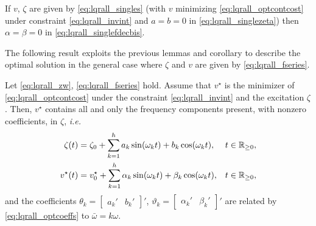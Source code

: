 \begin{corollary}
	If $v$, $\zeta$ are given by \eqref{eq:lqrall_singles} (with $v$ minimizing \eqref{eq:lqrall_optcontcost} under constraint \eqref{eq:lqrall_invint} and $a=b=0$ in \eqref{eq:lqrall_singlezeta}) then $\alpha=\beta=0$ in \eqref{eq:lqrall_singlefdecbis}.\closestatement
\end{corollary}

The following result exploits the previous lemmas and corollary to describe the optimal solution in the general case where $\zeta$ and $v$ are given by \eqref{eq:lqrall_fseries}.

\begin{lemma}
  \label{lem:lqrall_freqs}
  Let \eqref{eq:lqrall_zw}, \eqref{eq:lqrall_fseries} hold. Assume that $v^\star$ is the minimizer of \eqref{eq:lqrall_optcontcost} under the constraint \eqref{eq:lqrall_invint} and the excitation $\zeta$. Then, $v^{\star}$ contains all and only the frequency components present, with nonzero coefficients, in $\zeta$, \emph{i.e.}
  \begin{subequations}
    \label{eq:lqrall_vstarfreqs}
    \begin{align}
      \zeta(t) &= \zeta_0 + \sum_{k=1}^{h} a_k \sin(\omega_k t) + b_k \cos(\omega_k t), & t\in\mathbb{R}_{\geq 0},\\
      v^{\star}(t) &= v^{\star}_0 + \sum_{k=1}^{h} \alpha_k \sin(\omega_k t) + \beta_k \cos(\omega_k t), & t\in\mathbb{R}_{\geq 0},
    \end{align}
  \end{subequations}
  and the coefficients $\theta_k = \begin{bmatrix}a_k' & b_k'\end{bmatrix}'$, $\vartheta_k = \begin{bmatrix}\alpha_k' & \beta_k'\end{bmatrix}'$ are related by \eqref{eq:lqrall_optcoeffs} to $\bar{\omega} = k\omega$.\closestatement
\end{lemma}


